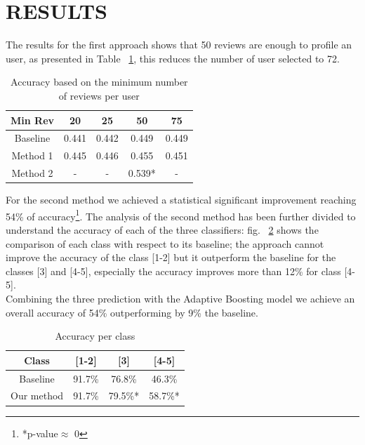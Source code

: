 \documentclass[11pt]{article}
\begin{document}
\section{RESULTS}
The results for the first approach shows that 50 reviews are enough to profile an user, as presented in Table ~\ref{tab}, this reduces the number of user selected to 72.\\
\begin{table}[]

	\caption{Accuracy based on the minimum number of reviews per user}
	\label{tab}
	\begin{tabular}{|c|c|c|c|c|}
		\hline
		Min Rev & 20    & 25    & 50     & 75    \\ \hline
		Baseline    & 0.441 & 0.442 & 0.449  & 0.449 \\ \hline
		Method 1    & 0.445 & 0.446 & 0.455  & 0.451 \\ \hline
		Method 2    & -     & -     & 0.539* & -     \\ \hline
	\end{tabular}
\end{table}
For the second method we achieved a statistical significant improvement reaching 54\% of accuracy\footnote{*p-value$\approx$ 0}. The analysis of the second method has been further divided to understand the accuracy of each of the three classifiers:
fig. ~\ref{class} shows the comparison of each class with respect to its baseline; the approach cannot improve the accuracy of the class [1-2] but it outperform the baseline for the classes [3] and [4-5], especially the accuracy improves more than 12\% for class [4-5].\\
Combining the three prediction with the Adaptive Boosting model we achieve an overall accuracy of 54\% outperforming by 9\% the baseline.
\begin{table}[]
	\centering
	\caption{Accuracy per class}
	\label{class}
	\begin{tabular}{|c|c|c|c|}
		\hline
		Class      & {[}1-2{]} & {[}3{]} & {[}4-5{]} \\ \hline
		Baseline   & 91.7\%    & 76.8\%  & 46.3\%    \\ \hline
		Our method & 91.7\%    & 79.5\%*  & 58.7\%*    \\ \hline
	\end{tabular}
\end{table}
\end{document}
